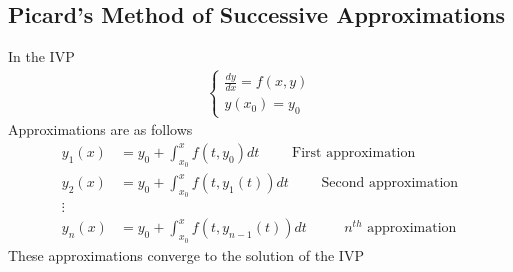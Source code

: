 \documentclass[oneside]{book}
\begin{document}
\subsection{Picard's Method of Successive Approximations}
In the IVP
\begin{align*}
	\begin{cases}
		\frac{dy}{dx} = f(x, y) \\
		y(x_0) = y_0
	\end{cases}
\end{align*}
Approximations are as follows
\begin{align*}
	y_1(x) & = y_0 + \int_{x_0}^{x}f(t, y_0)dt\qquad \text{ First approximation}             \\
	y_2(x) & = y_0 + \int_{x_0}^{x}f(t, y_1(t))dt\qquad \text{ Second approximation}         \\
	\vdots                                                                                   \\
	y_n(x) & = y_0 + \int_{x_0}^{x}f(t, y_{n-1}(t))dt\qquad \text{ \(n^{th}\) approximation}
\end{align*}
These approximations converge to the solution of the IVP
\begin{center}
\end{center}



\end{document}
